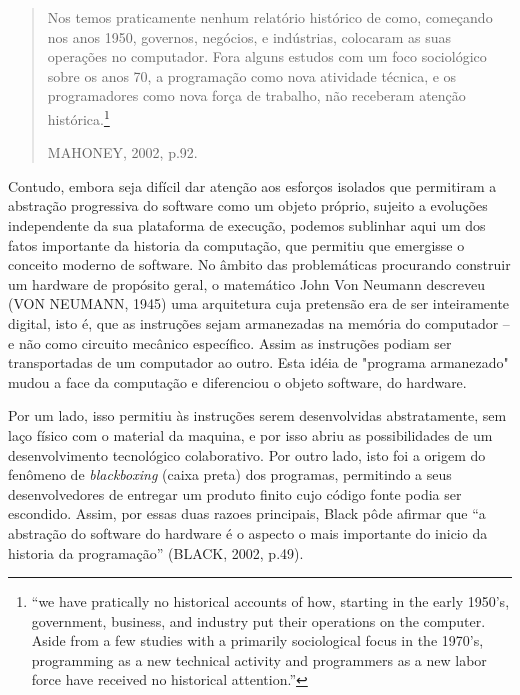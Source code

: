 \begin{quote}
Nos temos praticamente nenhum relatório histórico de como, começando nos anos 1950, governos, negócios, e indústrias, colocaram as suas operações no computador. Fora alguns estudos com um foco sociológico sobre os anos 70, a programação como nova atividade técnica, e os programadores como nova força de trabalho, não receberam atenção histórica.\footnote{“we have pratically no historical accounts of how, starting in the early 1950's, government, business, and industry put their operations on the computer. Aside from a few studies with a primarily sociological focus in the 1970's, programming as a new technical activity and programmers as a new labor force have received no historical attention.”}
\begin{flushright}
MAHONEY, 2002, p.92.
\end{flushright}
\end{quote}


Contudo, embora seja difícil dar atenção aos esforços isolados que permitiram a abstração progressiva do software como um objeto próprio, sujeito a evoluções independente da sua plataforma de execução, podemos sublinhar aqui um dos fatos importante da historia da computação, que permitiu que emergisse o conceito moderno de software. No âmbito das problemáticas procurando construir um hardware de propósito geral, o matemático John Von Neumann descreveu (VON NEUMANN, 1945) uma arquitetura cuja pretensão era de ser inteiramente digital, isto é, que as instruções sejam armanezadas na memória do computador – e não como circuito mecânico específico. Assim as instruções podiam ser transportadas de um computador ao outro. Esta idéia de "programa armanezado" mudou a face da computação e diferenciou o objeto software, do hardware.

Por um lado, isso permitiu às instruções serem desenvolvidas abstratamente, sem laço físico com o material da maquina, e por isso abriu as possibilidades de um desenvolvimento tecnológico colaborativo. Por outro lado, isto foi a origem do fenômeno de \emph{blackboxing} (caixa preta) dos programas, permitindo a seus desenvolvedores de entregar um produto finito cujo código fonte podia ser escondido. Assim, por essas duas razoes principais, Black pôde afirmar que “a abstração do software do hardware é o aspecto o mais importante do inicio da historia da programação” (BLACK, 2002, p.49).

